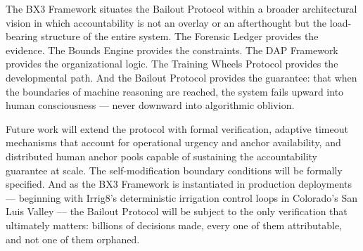 The BX3 Framework situates the Bailout Protocol within a broader architectural vision in which accountability is not an overlay or an afterthought but the load-bearing structure of the entire system. The Forensic Ledger provides the evidence. The Bounds Engine provides the constraints. The DAP Framework provides the organizational logic. The Training Wheels Protocol provides the developmental path. And the Bailout Protocol provides the guarantee: that when the boundaries of machine reasoning are reached, the system fails upward into human consciousness — never downward into algorithmic oblivion.

Future work will extend the protocol with formal verification, adaptive timeout mechanisms that account for operational urgency and anchor availability, and distributed human anchor pools capable of sustaining the accountability guarantee at scale. The self-modification boundary conditions will be formally specified. And as the BX3 Framework is instantiated in production deployments — beginning with Irrig8's deterministic irrigation control loops in Colorado's San Luis Valley — the Bailout Protocol will be subject to the only verification that ultimately matters: billions of decisions made, every one of them attributable, and not one of them orphaned.